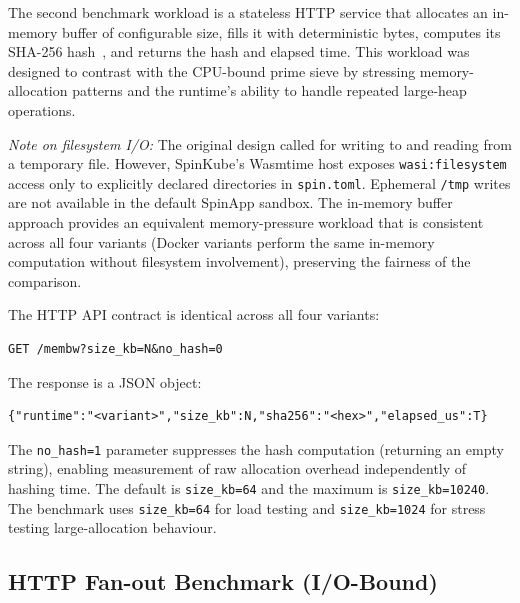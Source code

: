 The second benchmark workload is a stateless \acs{HTTP} service that allocates an in-memory buffer of configurable size, fills it with deterministic bytes, computes its \acs{SHA}-256 hash~\cite{nist2015fips180}, and returns the hash and elapsed time. This workload was designed to contrast with the \acs{CPU}-bound prime sieve by stressing memory-allocation patterns and the runtime's ability to handle repeated large-heap operations.

\begin{sloppypar}
\textit{Note on filesystem I/O:} The original design called for writing to and reading from a temporary file. However, SpinKube's Wasmtime host exposes \texttt{wasi:filesystem} access only to explicitly declared directories in \texttt{spin.toml}. Ephemeral \texttt{/tmp} writes are not available in the default SpinApp sandbox. The in-memory buffer approach provides an equivalent memory-pressure workload that is consistent across all four variants (Docker variants perform the same in-memory computation without filesystem involvement), preserving the fairness of the comparison.
\end{sloppypar}

The \acs{HTTP} \acs{API} contract is identical across all four variants:

\begin{verbatim}
GET /membw?size_kb=N&no_hash=0
\end{verbatim}

The response is a \acs{JSON} object:
\begin{verbatim}
{"runtime":"<variant>","size_kb":N,"sha256":"<hex>","elapsed_us":T}
\end{verbatim}

\begin{sloppypar}
The \texttt{no\_hash=1} parameter suppresses the hash computation (returning an empty string), enabling measurement of raw allocation overhead independently of hashing time. The default is \texttt{size\_kb=64} and the maximum is \texttt{size\_kb=10240}. The benchmark uses \texttt{size\_kb=64} for load testing and \texttt{size\_kb=1024} for stress testing large-allocation behaviour.
\end{sloppypar}

\subsection{HTTP Fan-out Benchmark (I/O-Bound)}
\label{sec:http_fanout_workload}

